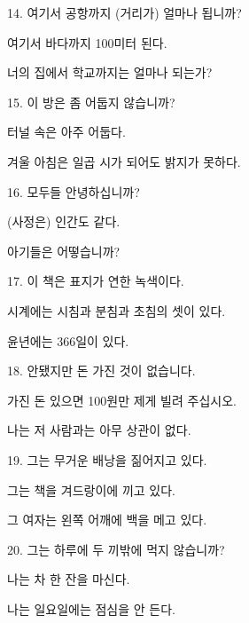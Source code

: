 \begin{problem}{14. }
    여기서 공항까지 (거리가) 얼마나 됩니까?

    여기서 바다까지 100미터 된다.

    너의 집에서 학교까지는 얼마나 되는가?
    \vspace{1pc}
\end{problem}

\begin{problem}{15. }
    이 방은 좀 어둡지 않습니까?

    터널 속은 아주 어둡다.

    겨울 아침은 일곱 시가 되어도 밝지가 못하다.
    \vspace{1pc}
\end{problem}

\begin{problem}{16. }
    모두들 안녕하십니까?

    (사정은) 인간도 같다.

    아기들은 어떻습니까?
    \vspace{1pc}
\end{problem}

\begin{problem}{17. }
    이 책은 표지가 연한 녹색이다.

    시계에는 시침과 분침과 초침의 셋이 있다.

    윤년에는 366일이 있다.
    \vspace{1pc}
\end{problem}

\begin{problem}{18. }
    안됐지만 돈 가진 것이 없습니다.

    가진 돈 있으면 100원만 제게 빌려 주십시오.

    나는 저 사람과는 아무 상관이 없다.
    \vspace{1pc}
\end{problem}

\begin{problem}{19. }
    그는 무거운 배낭을 짊어지고 있다.

    그는 책을 겨드랑이에 끼고 있다.

    그 여자는 왼쪽 어깨에 백을 메고 있다.
    \vspace{1pc}
\end{problem}

\begin{problem}{20. }
    그는 하루에 두 끼밖에 먹지 않습니까?

    나는 차 한 잔을 마신다.

    나는 일요일에는 점심을 안 든다.
    \vspace{1pc}
\end{problem}
